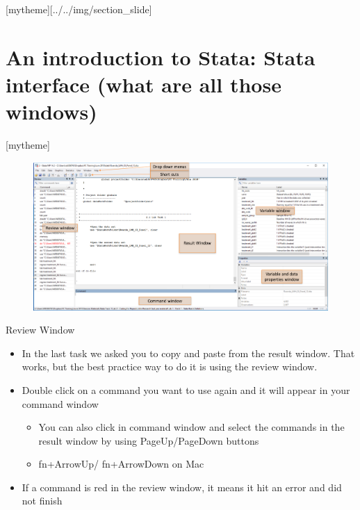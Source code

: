 \documentclass[aspectratio=169]{beamer}
\newcommand{\sectionpic}[2]{
	\setbeamertemplate{section page}[mytheme][#2]
	\section{#1}
	\setbeamertemplate{section page}[mytheme]
}
\begin{document}
\sectionpic{An introduction to Stata: Stata interface (what are all those windows)}{../../img/section_slide}

\begin{frame}{}
	\begin{figure}
		\centering
		\includegraphics[width=\linewidth]{img/window_des}
	\end{figure}
\end{frame}

\begin{frame}{Review Window}

\begin{itemize}
	\item In the last task we asked you to copy and paste from the result window. That works, but the best practice way to do it is using the review window.

	\item Double click on a command you want to use again and it will appear in your command window
	\begin{itemize}
		\item You can also click in command window and select the commands in the result window by using PageUp/PageDown buttons
		\item fn+ArrowUp/ fn+ArrowDown on Mac
	\end{itemize}
	\item If a command is red in the review window, it means it hit an error and did not finish
\end{itemize}
\end{frame}
\end{document}
